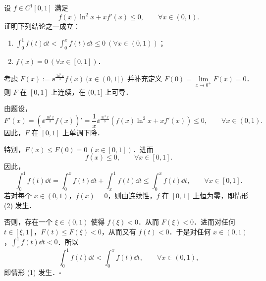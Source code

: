 设 $f\in C^1[0,1]$ 满足
\[
  f(x)\ln^2 x+xf'(x)\leqslant 0,\qquad \forall x\in(0,1).
\]
证明下列结论之一成立：
\begin{enumerate}[label=(\arabic*)]
  \item $\displaystyle\int_0^1 f(t)\dd t<\int_0^x f(t)\dd t\leqslant 0\ (\forall x\in(0,1))$；
  \item $f(x)=0\ (\forall x\in[0,1])$．
\end{enumerate}
\begin{solution}
考虑 $F(x):=\ee^{\frac{\ln^3 x}{3}}f(x)\ (x\in(0,1])$ 并补充定义 $F(0)=\lim\limits_{x\to0^+}F(x)=0$．则 $F$ 在 $[0,1]$ 上连续，在 $(0,1]$ 上可导．

由题设，
\[
  F'(x)=\left(\ee^{\frac{\ln^3 x}{3}}f(x)\right)'
  =\frac{1}{x}\ee^{\frac{\ln^3 x}{3}}\left(f(x)\ln^2 x+xf'(x)\right)\leqslant 0,
  \qquad \forall x\in(0,1).
\]
因此，$F$ 在 $[0,1]$ 上单调下降．

特别，$F(x)\leqslant F(0)=0\ (x\in[0,1])$．进而
\[
  f(x)\leqslant 0,\qquad \forall x\in[0,1].
\]
因此，
\[
  \int_0^1 f(t)\dd t=\int_0^x f(t)\dd t+\int_x^1 f(t)\dd t\leqslant\int_0^x f(t)\dd t,
  \qquad \forall x\in[0,1].
\]
若对每个 $x\in(0,1)$，$f(x)=0$，则由连续性，$f$ 在 $[0,1]$ 上恒为零，即情形 (2) 发生．

否则，存在一个 $\xi\in(0,1)$ 使得 $f(\xi)<0$．从而 $F(\xi)<0$．进而对任何 $t\in[\xi,1]$，$F(t)\leqslant F(\xi)<0$，从而又有 $f(t)<0$．于是对任何 $x\in(0,1)$，$\displaystyle\int_x^1 f(t)\dd t<0$．所以
\[
  \int_0^1 f(t)\dd t<\int_0^x f(t)\dd t,\qquad \forall x\in(0,1),
\]
即情形 (1) 发生．$\square$
\end{solution}
